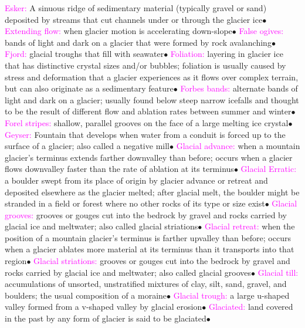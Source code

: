 \documentclass{article}
\newcommand{\ddd}{$\bullet$}
\newcommand{\pink}[1]{\textcolor{magenta}{#1}}
\newcommand{\vocab}[1]{{\pink{#1}}}
\begin{document}
\begin{multicols*}{4}
		\vocab{        Esker: } A sinuous ridge of sedimentary material (typically gravel or sand) deposited by streams that cut channels under or through the glacier ice\ddd
		\vocab{        Extending flow: } when glacier motion is accelerating down-slope\ddd
		\vocab{        False ogives: } bands of light and dark on a glacier that were formed by rock avalanching\ddd
		\vocab{        Fjord: } glacial troughs that fill with seawater\ddd
		\vocab{        Foliation: } layering in glacier ice that has distinctive crystal sizes and/or bubbles; foliation is usually caused by stress and deformation that a glacier experiences as it flows over complex terrain, but can also originate as a sedimentary feature\ddd
		\vocab{        Forbes bands: } alternate bands of light and dark on a glacier; usually found below steep narrow icefalls and thought to be the result of different flow and ablation rates between summer and winter\ddd
		\vocab{        Forel stripes: } shallow, parallel grooves on the face of a large melting ice crystal\ddd 
		\vocab{        Geyser: } Fountain that develops when water from a conduit is forced up to the surface of a glacier; also called a negative mill\ddd
		\vocab{        Glacial advance: } when a mountain glacier's terminus extends farther downvalley than before; occurs when a glacier flows downvalley faster than the rate of ablation at its terminus\ddd
		\vocab{        Glacial Erratic: } a boulder swept from its place of origin by glacier advance or retreat and deposited elsewhere as the glacier melted; after glacial melt, the boulder might be stranded in a field or forest where no other rocks of its type or size exist\ddd
		\vocab{        Glacial grooves: } grooves or gouges cut into the bedrock by gravel and rocks carried by glacial ice and meltwater; also called glacial striations\ddd
		\vocab{        Glacial retreat: } when the position of a mountain glacier's terminus is farther upvalley than before; occurs when a glacier ablates more material at its terminus than it transports into that region\ddd
		\vocab{        Glacial striations: } grooves or gouges cut into the bedrock by gravel and rocks carried by glacial ice and meltwater; also called glacial grooves\ddd
		\vocab{        Glacial till: } accumulations of unsorted, unstratified mixtures of clay, silt, sand, gravel, and boulders; the usual composition of a moraine\ddd
		\vocab{        Glacial trough: } a large u-shaped valley formed from a v-shaped valley by glacial erosion\ddd
		\vocab{        Glaciated: } land covered in the past by any form of glacier is said to be glaciated\ddd

\end{multicols*}
\end{document}
